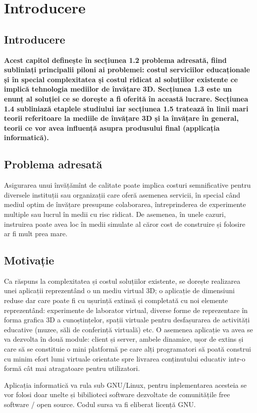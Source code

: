 
\chapter{Introducere}
\label{cap:Introducere}
\pagestyle{headings}
\section{Introducere}
\par \textbf{Acest capitol definește în secțiunea 1.2 problema adresată, fiind subliniați principalii piloni ai problemei: costul serviciilor educaționale și în special complexitatea și costul ridicat al soluțiilor existente ce implică tehnologia mediilor de învățare 3D. Secțiunea 1.3 este un enunț al soluției ce se dorește a fi oferită în această lucrare. Secțiunea 1.4 subliniază etaplele studiului iar secțiunea 1.5 tratează în linii mari teorii referitoare la mediile de învățare 3D și la învățare în general, teorii ce vor avea influență asupra produsului final (applicația informatică).}
\section{Problema adresată}
\par Asigurarea unui învățămînt de calitate poate implica costuri semnificative pentru diversele instituții sau organizații care oferă asemenea servicii, în special când mediul optim de învățare presupune colaborarea, întreprinderea de experimente multiple sau lucrul în medii cu risc ridicat. De asemenea, în unele cazuri, instruirea poate avea loc în medii simulate al căror cost de construire și folosire ar fi mult prea mare.
\section{Motivație}
\par Ca răspuns la complexitatea și costul soluțiilor existente, se dorește realizarea unei aplicații reprezentând o un mediu virtual 3D; o aplicație de dimensiuni reduse dar care poate fi cu ușurință extinsă și completată cu noi elemente reprezentând: experimente de laborator virtual, diverse forme de reprezentare în forma grafica 3D a cunoștințelor, spații virtuale pentru desfașurarea de activități educative (muzee, săli de conferință virtuală) etc. 
O asemenea aplicație va avea se va dezvolta în două module: client și server, ambele dinamice, ușor de extins și care să se constituie o mini platformă pe care alți programatori să poată construi cu minim efort lumi virtuale orientate spre livrarea conținutului educativ intr-o formă cât mai atragatoare pentru utilizatori.
\par Aplicația informatică va rula sub GNU/Linux, pentru inplementarea acesteia se vor folosi doar unelte și bibilioteci software dezvoltate de comunitățile free software / open source. Codul sursa va fi eliberat licență GNU.
